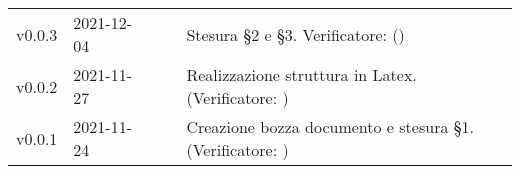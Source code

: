 \begin{longtable}{ m{}<{\centering}  m{}<{\centering}  m{}<{\centering}  m{}<{\centering}  m{}<{\centering} }
	v0.0.3& 2021-12-04 & \MB{} & \AM{} & Stesura §2 e §3. Verificatore: (\textit{\FP}) \\

	v0.0.2& 2021-11-27 & \EP{} & \AM{} & Realizzazione struttura in Latex. (Verificatore: \textit{\FP})\\

	v0.0.1& 2021-11-24 & \MB{} & \RE{} & Creazione bozza documento e stesura §1. (Verificatore: \textit{\FP}) \\

\end{longtable}

\pagebreak
